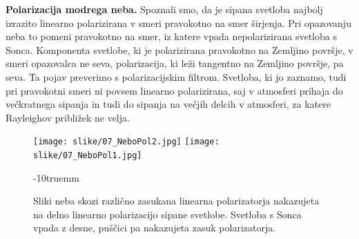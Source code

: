 \begin{example}{\bf Polarizacija modrega neba.}
Spoznali smo, da je sipana svetloba najbolj izrazito linearno polarizirana v smeri pravokotno na smer 
širjenja. Pri opazovanju neba to pomeni pravokotno na smer, iz katere vpada nepolarizirana 
svetloba s Sonca. Komponenta svetlobe, ki je polarizirana pravokotno na Zemljino površje, 
v smeri opazovalca ne seva, polarizacija, ki leži tangentno na Zemljino površje, pa seva. Ta
pojav preverimo s polarizacijskim filtrom. Svetloba, ki jo zaznamo, tudi pri pravokotni smeri
ni povsem linearno polarizirana, saj v atmosferi prihaja do večkratnega sipanja in tudi do 
sipanja na večjih delcih v atmosferi, za katere Rayleighov približek ne velja.
\begin{figure}[!h]
\centering
\texttt{[image: slike/07\_NeboPol2.jpg]}\hfill
\texttt{[image: slike/07\_NeboPol1.jpg]}
\caption{Sliki neba skozi različno zasukana linearna polarizatorja nakazujeta na delno
linearno polarizacijo sipane svetlobe. Svetloba s Sonca vpada z desne, puščici pa nakazujeta
zasuk polarizatorja.}
\label{fig:07_NeboPol}
\vglue-10truemm
\end{figure}

\end{example}
% 
